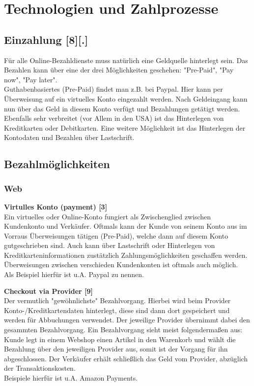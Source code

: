 \section{Technologien und Zahlprozesse}

\subsection{Einzahlung [8][.]}
Für alle Online-Bezahldienste muss natürlich eine Geldquelle hinterlegt sein. Das Bezahlen kann über eine der drei Möglichkeiten geschehen: "Pre-Paid", "Pay now", "Pay later".\\
Guthabenbasiertes (Pre-Paid) findet man z.B. bei Paypal. Hier kann per Überweisung auf ein virtuelles Konto eingezahlt werden. Nach Geldeingang kann nun über das Geld in diesem Konto verfügt und Bezahlungen getätigt werden.
Ebenfalls sehr verbreitet (vor Allem in den USA) ist das Hinterlegen von Kreditkarten oder Debitkarten. Eine weitere Möglichkeit ist das Hinterlegen der Kontodaten und Bezahlen über Lastschrift.

\subsection{Bezahlmöglichkeiten}
\subsubsection{Web}
\textbf{Virtulles Konto (payment) [3]}\\
Ein virtuelles oder Online-Konto fungiert als Zwischenglied zwischen Kundenkonto und Verkäufer. Oftmals kann der Kunde von seinem Konto aus im Vorraus Überweisungen tätigen (Pre-Paid), welche dann auf diesem Konto gutgeschrieben sind. Auch kann über Lastschrift oder Hinterlegen von Kreditkarteninformationen zustätzlich Zahlungsmöglichkeiten geschaffen werden.\\
Überweisungen zwischen verschieden Kundenkonten ist oftmals auch möglich.\\
Als Beispiel hierfür ist u.A. Paypal zu nennen.

\textbf{Checkout via Provider [9]}\\
Der vermutlich "gewöhnlichste" Bezahlvorgang. Hierbei wird beim Provider Konto-/Kreditkartendaten hinterlegt, diese sind dann dort gespeichert und werden für Abbuchungen verwendet.
Der jeweilige Provider übernimmt dabei den gesammten Bezahlvorgang. Ein Bezahlvorgang sieht meist folgendermaßen aus: Kunde legt in einem Webshop einen Artikel in den Warenkorb und wählt die Bezahlung über den jeweiligen Provider aus, somit ist der Vorgang für ihn abgeschlossen. Der Verkäufer erhält schließlich das Geld vom Provider, abzüglich der Transaktionskosten.\\
Beispiele hierfür ist u.A. Amazon Payments.


